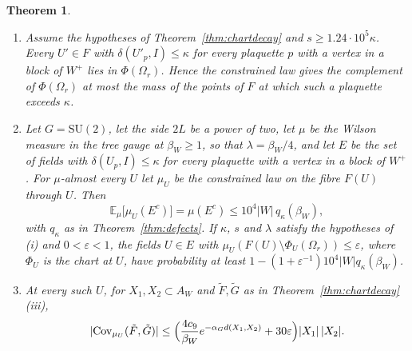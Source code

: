 \documentclass[11pt]{amsart}
\newtheorem{theorem}{Theorem}[section]
\theoremstyle{definition}
\theoremstyle{remark}
\numberwithin{equation}{section}
\newcommand{\E}{\mathbb{E}}
\newcommand{\SU}{\mathrm{SU}}
\newcommand{\Cov}{\operatorname{Cov}}
\begin{document}
\begin{theorem}\label{thm:offchart}
\begin{enumerate}[label=\textup{(\roman*)},leftmargin=*]
\item Assume the hypotheses of Theorem~\ref{thm:chartdecay} and $s\ge1.24
\cdot10^5\kappa$. Every $U'\in F$ with $\delta(U'_p,I)\le\kappa$ for every
plaquette $p$ with a vertex in a block of $W^+$ lies in $\Phi(\Omega_r)$.
Hence the constrained law gives the complement of $\Phi(\Omega_r)$ at most
the mass of the points of $F$ at which such a plaquette exceeds $\kappa$.
\item Let $G=\SU(2)$, let the side $2L$ be a power of two, let $\mu$ be the
Wilson measure in the tree gauge at $\beta_W\ge1$, so that $\lambda=\beta
_W/4$, and let $E$ be the set of fields with $\delta(U_p,I)\le\kappa$ for
every plaquette with a vertex in a block of $W^+$. For $\mu$-almost every
$U$ let $\mu_U$ be the constrained law on the fibre $F(U)$ through $U$.
Then
\[
\E_\mu\bigl[\mu_U(E^c)\bigr]=\mu(E^c)\le10^4\lvert W\rvert\,q_\kappa(\beta
_W),
\]
with $q_\kappa$ as in Theorem~\ref{thm:defects}. If $\kappa$, $s$ and
$\lambda$ satisfy the hypotheses of \textup{(i)} and $0<\varepsilon<1$,
the fields $U\in E$ with $\mu_U(F(U)\setminus\Phi_U(\Omega_r))\le
\varepsilon$, where $\Phi_U$ is the chart at $U$, have probability at least
$1-(1+\varepsilon^{-1})10^4\lvert W\rvert q_\kappa(\beta_W)$.
\item At every such $U$, for $X_1,X_2\subset A_W$ and $\tilde F,\tilde G$
as in Theorem~\ref{thm:chartdecay}\textup{(iii)},
\[
\lvert\Cov_{\mu_U}(\tilde F,\tilde G)\rvert\le\Bigl(\frac{4c_9}{\beta_W}
e^{-\alpha_Gd(X_1,X_2)}+30\varepsilon\Bigr)\lvert X_1\rvert\,\lvert X_2
\rvert .
\]
\end{enumerate}
\end{theorem}
\end{document}
